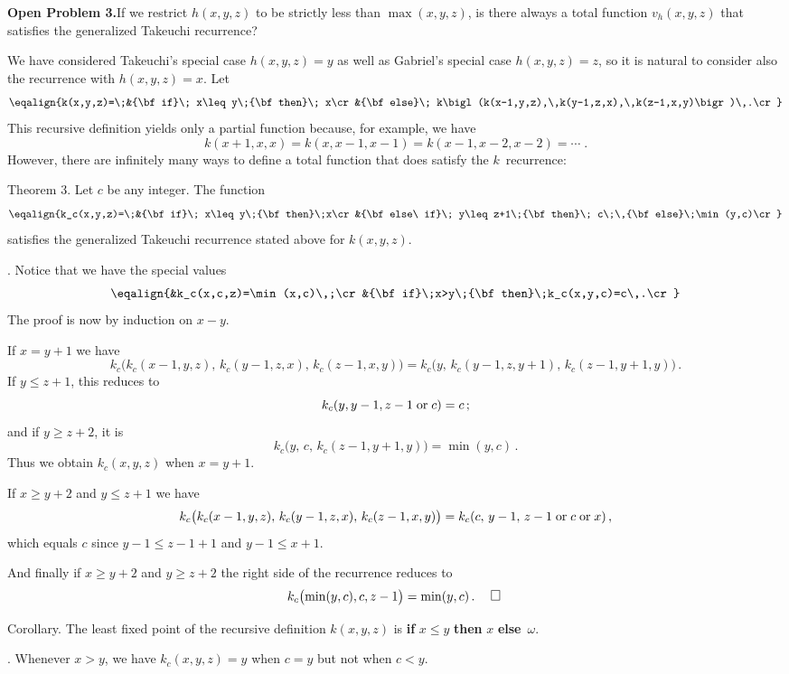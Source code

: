 \bigskip\noindent
{\bf Open Problem 3.}\enspace If we restrict $h(x,y,z)$ to be strictly
less than $\max(x,y,z)$, is there always a total function $v_h(x,y,z)$
that satisfies the generalized Takeuchi recurrence?\quad\pfbox

\bigskip
We have considered Takeuchi's special case $h(x,y,z)=y$ 
as well as  Gabriel's
special case ${h(x,y,z)=z}$, so it is natural to consider also the
recurrence with $h(x,y,z)=x$. Let
$$\eqalign{k(x,y,z)=\;&{\bf if}\; x\leq y\;{\bf then}\; x\cr
&{\bf else}\; k\bigl(k(x-1,y,z),\,k(y-1,z,x),\,k(z-1,x,y)\bigr)\,.\cr}$$
This recursive definition yields only a partial function because, for
example, we have
$$k(x+1,x,x)=k(x,x-1,x-1)=k(x-1,x-2,x-2)=\cdots\;.$$
However, there are infinitely many ways to define a total function
that does satisfy the $k$~recurrence:

\proclaim Theorem 3. Let $c$ be any integer. The function
$$\eqalign{k_c(x,y,z)=\;&{\bf if}\; x\leq y\;{\bf then}\;x\cr
&{\bf else\ if}\; y\leq z+1\;{\bf then}\; c\;\,{\bf
else}\;\min(y,c)\cr}$$
satisfies the generalized Takeuchi recurrence stated above for
$k(x,y,z)$.

.\enspace
Notice that we have the special values
$$\eqalign{&k_c(x,c,z)=\min(x,c)\,;\cr
&{\bf if}\;x>y\;{\bf then}\;k_c(x,y,c)=c\,.\cr}$$
The proof is now by induction on $x-y$.

If $x=y+1$ we have
$$k_c\bigl(k_c(x-1,y,z),\,k_c(y-1,z,x),\,k_c(z-1,x,y)\bigr)
=k_c\bigl(y,\,k_c(y-1,z,y+1),\,k_c(z-1,y+1,y)\bigr)\,.$$
If $y\leq z+1$, this reduces to
$$k_c(y,y-1,z-1\;{\rm or}\; c)=c\,;$$
and if $y\geq z+2$, it is
$$k_c\bigl(y,\,c,\,k_c(z-1,y+1,y)\bigr)=\min(y,c)\,.$$
Thus we obtain $k_c(x,y,z)$ when $x=y+1$.

If $x\geq y+2$ and $y\leq z+1$ we have
$$k_c\bigl(k_c(x-1,y,z),\,k_c(y-1,z,x),\,k_c(z-1,x,y)\bigr)
=k_c(c,\,y-1,\,z-1\;{\rm or}\; c\;{\rm or}\; x)\,,$$
which equals $c$ since $y-1\leq z-1+1$ and $y-1\leq x+1$.

And finally if $x\geq y+2$ and $y\geq z+2$ the right side of the
recurrence reduces to
$$k_c\bigl(\min(y,c),c,z-1\bigr)=\min(y,c)\,.\quad\pfbox$$

\proclaim Corollary. The least fixed point of the recursive definition
$k(x,y,z)$ is {\bf if} $x\leq y$ {\bf then} $x$ {\bf else}~$\omega$.

.\enspace
Whenever $x>y$, we have $k_c(x,y,z)=y$ when $c=y$ but not when
$c<y$.\quad\pfbox 


